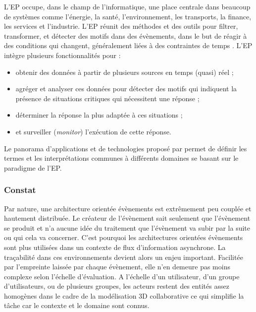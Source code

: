 L'\gls{EP} occupe, dans le champ de l'informatique, une place centrale dans 
beaucoup de systèmes comme l'énergie, la santé, l'environnement, les transports, 
la finance, les services et l'industrie. L'\gls{EP} réunit des méthodes et des outils 
pour filtrer, transformer, et détecter des motifs dans des évènements, dans le but 
de réagir à des conditions qui changent, généralement liées à des contraintes de 
temps \cite{Chandy2011}. L'\gls{EP} intègre plusieurs fonctionnalités pour :
\begin{itemize}
	\item obtenir des données à partir de plusieurs sources en temps (quasi) réel ;
	\item agréger et analyser ces données pour détecter des motifs qui indiquent la 
	présence de situations critiques qui nécessitent une réponse ;
	\item déterminer la réponse la plus adaptée à ces situations ;
	\item et surveiller (\textit{monitor}) l'exécution de cette réponse.
\end{itemize}

Le panorama d'applications et de technologies proposé par \cite{Hinze2009} 
permet de définir les termes et les interprétations communes à différents 
domaines se basant sur le paradigme de l'\gls{EP}. 





\subsubsection{Constat}

Par nature, une architecture orientée évènements est extrêmement peu couplée et 
hautement distribuée. Le créateur de l'évènement sait seulement que l'évènement 
se produit et n'a aucune idée du traitement que l'évènement va subir par 
la suite ou qui cela va concerner. 
C'est pourquoi les architectures orientées évènements sont plus utilisées dans un 
contexte de flux d'information asynchrone. La traçabilité dans ces environnements 
devient alors un enjeu important. Facilitée par l'empreinte laissée par chaque 
évènement, elle n'en demeure pas moins complexe selon l'échelle d'évaluation. A 
l'échelle d'un utilisateur, d'un groupe d'utilisateurs, ou de plusieurs groupes, les 
acteurs restent des entités assez homogènes dans le cadre de la modélisation 3D 
collaborative ce qui simplifie la tâche car le contexte et le domaine sont 
connus.



